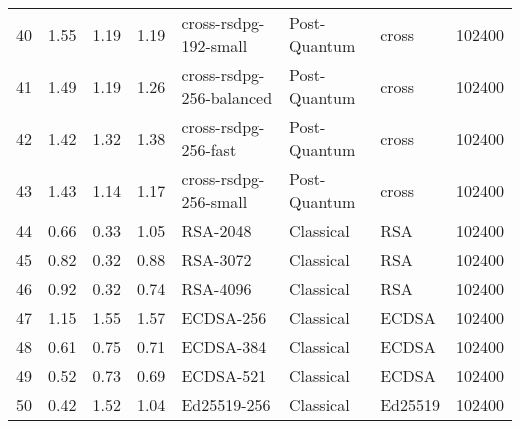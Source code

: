 \begin{table}
\begin{tabular}{lrrrlllr}
40 & 1.55 & 1.19 & 1.19 & cross-rsdpg-192-small & Post-Quantum & cross & 102400 \\
41 & 1.49 & 1.19 & 1.26 & cross-rsdpg-256-balanced & Post-Quantum & cross & 102400 \\
42 & 1.42 & 1.32 & 1.38 & cross-rsdpg-256-fast & Post-Quantum & cross & 102400 \\
43 & 1.43 & 1.14 & 1.17 & cross-rsdpg-256-small & Post-Quantum & cross & 102400 \\
44 & 0.66 & 0.33 & 1.05 & RSA-2048 & Classical & RSA & 102400 \\
45 & 0.82 & 0.32 & 0.88 & RSA-3072 & Classical & RSA & 102400 \\
46 & 0.92 & 0.32 & 0.74 & RSA-4096 & Classical & RSA & 102400 \\
47 & 1.15 & 1.55 & 1.57 & ECDSA-256 & Classical & ECDSA & 102400 \\
48 & 0.61 & 0.75 & 0.71 & ECDSA-384 & Classical & ECDSA & 102400 \\
49 & 0.52 & 0.73 & 0.69 & ECDSA-521 & Classical & ECDSA & 102400 \\
50 & 0.42 & 1.52 & 1.04 & Ed25519-256 & Classical & Ed25519 & 102400 \\
\bottomrule
\end{tabular}
\end{table}
